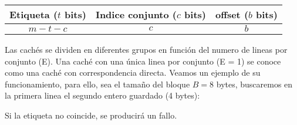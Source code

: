 \begin{center}
\begin{tabular}{|c|c|c|}
  \hline
  \textbf{Etiqueta} ($t$ bits) & \textbf{Indice conjunto} ($c$ bits) & \textbf{offset} ($b$ bits) \\
  \hline
  $m-t-c$ & $c$ & $b$ \\
  \hline
\end{tabular}
\end{center}
Las cachés se dividen en diferentes grupos en función del numero de lineas por conjunto (E). Una caché con una única 
linea por conjunto (E = 1) se conoce como una caché con correspondencia directa. Veamos un ejemplo de su funcionamiento, para ello,
sea el tamaño del bloque $B = 8$ bytes, buscaremos en la primera linea el segundo entero guardado (4 bytes):
\begin{center}
    
\end{center}
Si la etiqueta no coincide, se producirá un fallo.
